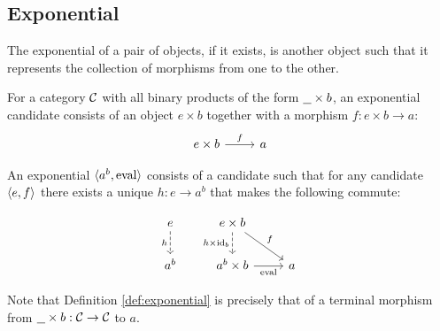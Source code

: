 \subsection{Exponential}
The exponential of a pair of objects, if it exists, is another object such that
it represents the collection of morphisms from one to the other.
\begin{definition}

  For a category $\mathcal{C}$ with all binary products of the form $\underline{\ \ }\times b$, an
  exponential candidate consists of an object $e\times b$ together with a morphism $f: e\times b\to a$:
  \[\begin{tikzcd}[ampersand replacement=\&]
    {e\times b} \& a
    \arrow["f", from=1-1, to=1-2]
  \end{tikzcd}\]

  An exponential $\langle a^b,\mathrm{eval}\rangle$ consists of a candidate
  such that for any candidate $\langle e, f\rangle$ there exists a unique $h:e\to a^b$ that
  makes the following commute:
  \parencite{awodey:category_theory}

  \[\begin{tikzcd}[ampersand replacement=\&]
    e \& {e\times b} \\
    {a^b} \& {a^b\times b} \& a
    \arrow["{\mathrm{eval}}"', from=2-2, to=2-3]
    \arrow["{h\times\id_b}"', dashed, from=1-2, to=2-2]
    \arrow["f", from=1-2, to=2-3]
    \arrow["h"', dashed, from=1-1, to=2-1]
  \end{tikzcd}\]
\end{definition}

\begin{remark}
  Note that Definition \ref{def:exponential} is precisely that of a terminal
  morphism from $\underline{\ \ }\times b: \mathcal{C}\to \mathcal{C}$ to $a$.
\end{remark}